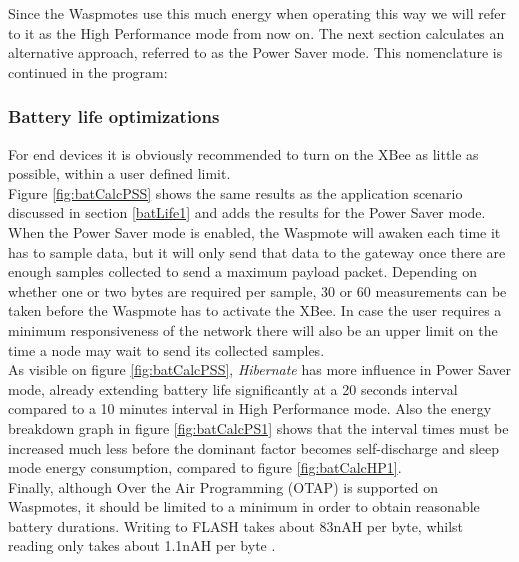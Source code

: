 Since the Waspmotes use this much energy when operating this way we will refer to it as the High Performance mode from now on. The next section calculates an alternative approach, referred to as the Power Saver mode. This nomenclature is continued in the program:
\subsubsection{Battery life optimizations}
\label{powerSaver}
For end devices it is obviously recommended to turn on the XBee as little as possible, within a user defined limit.\\ Figure \ref{fig:batCalcPSS} shows the same results as the application scenario discussed in section \ref{batLife1} and adds the results for the Power Saver mode.\\
When the Power Saver mode is enabled, the Waspmote will awaken each time it has to sample data, but it will only send that data to the gateway once there are enough samples collected to send a maximum payload packet. Depending on whether one or two bytes are required per sample, 30 or 60 measurements can be taken before the Waspmote has to activate the XBee. In case the user requires a minimum responsiveness of the network there will also be an upper limit on the time a node may wait to send its collected samples.\\
As visible on figure \ref{fig:batCalcPSS}, \textit{Hibernate} has more influence in Power Saver mode, already extending battery life significantly at a 20 seconds interval compared to a 10 minutes interval in High Performance mode. Also the energy breakdown graph in figure \ref{fig:batCalcPS1} shows that the interval times must be increased much less before the dominant factor becomes self-discharge and sleep mode energy consumption, compared to figure \ref{fig:batCalcHP1}.\\
Finally, although Over the Air Programming (OTAP) is supported on Waspmotes, it should be limited to a minimum in order to obtain reasonable battery durations. Writing to FLASH takes about 83nAH per byte, whilst reading only takes about 1.1nAH per byte \citep{KTH}. 